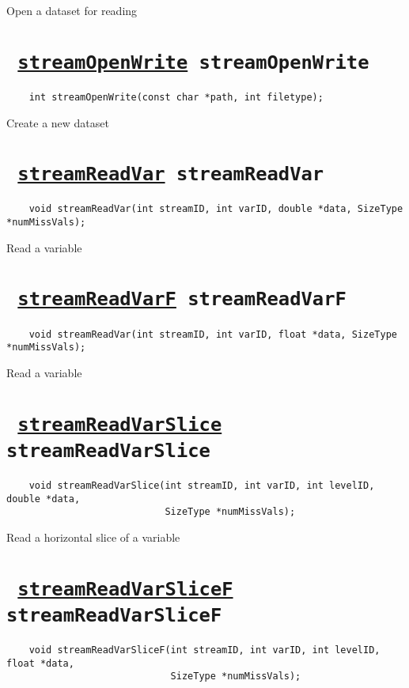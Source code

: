 Open a dataset for reading
\ifpdfoutput{}{(\ref{streamOpenRead})}


\section*{\texttt{ 
\ifpdf
\hyperref[streamOpenWrite]{streamOpenWrite}
\else
streamOpenWrite
\fi
}}
\begin{verbatim}
    int streamOpenWrite(const char *path, int filetype);
\end{verbatim}

Create a new dataset
\ifpdfoutput{}{(\ref{streamOpenWrite})}


\section*{\texttt{ 
\ifpdf
\hyperref[streamReadVar]{streamReadVar}
\else
streamReadVar
\fi
}}
\begin{verbatim}
    void streamReadVar(int streamID, int varID, double *data, SizeType *numMissVals);
\end{verbatim}

Read a variable
\ifpdfoutput{}{(\ref{streamReadVar})}


\section*{\texttt{ 
\ifpdf
\hyperref[streamReadVarF]{streamReadVarF}
\else
streamReadVarF
\fi
}}
\begin{verbatim}
    void streamReadVar(int streamID, int varID, float *data, SizeType *numMissVals);
\end{verbatim}

Read a variable
\ifpdfoutput{}{(\ref{streamReadVarF})}


\section*{\texttt{ 
\ifpdf
\hyperref[streamReadVarSlice]{streamReadVarSlice}
\else
streamReadVarSlice
\fi
}}
\begin{verbatim}
    void streamReadVarSlice(int streamID, int varID, int levelID, double *data, 
                            SizeType *numMissVals);
\end{verbatim}

Read a horizontal slice of a variable
\ifpdfoutput{}{(\ref{streamReadVarSlice})}


\section*{\texttt{ 
\ifpdf
\hyperref[streamReadVarSliceF]{streamReadVarSliceF}
\else
streamReadVarSliceF
\fi
}}
\begin{verbatim}
    void streamReadVarSliceF(int streamID, int varID, int levelID, float *data, 
                             SizeType *numMissVals);
\end{verbatim}

